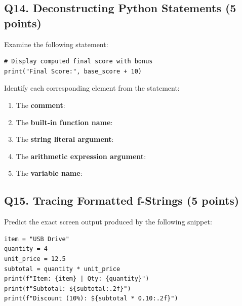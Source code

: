 \documentclass[11pt,a4paper]{article}
\begin{document}
\vspace{0.08cm}

\subsection*{Q14. Deconstructing Python Statements (5 points)}

Examine the following statement:

\begin{lstlisting}
# Display computed final score with bonus
print("Final Score:", base_score + 10)
\end{lstlisting}

Identify each corresponding element from the statement:

\begin{enumerate}[label=\alph*., noitemsep]

  \item The \textbf{comment}: \underline{\hspace{10cm}}

  \item The \textbf{built-in function name}: \underline{\hspace{8.2cm}}

  \item The \textbf{string literal argument}: \underline{\hspace{8cm}}

  \item The \textbf{arithmetic expression argument}: \underline{\hspace{7cm}}

  \item The \textbf{variable name}: \underline{\hspace{9.4cm}}

\end{enumerate}

\vspace{0.08cm}

\subsection*{Q15. Tracing Formatted f-Strings (5 points)}

Predict the exact screen output produced by the following snippet:

\begin{lstlisting}
item = "USB Drive"
quantity = 4
unit_price = 12.5
subtotal = quantity * unit_price
print(f"Item: {item} | Qty: {quantity}")
print(f"Subtotal: ${subtotal:.2f}")
print(f"Discount (10%): ${subtotal * 0.10:.2f}")
\end{lstlisting}
\end{document}
